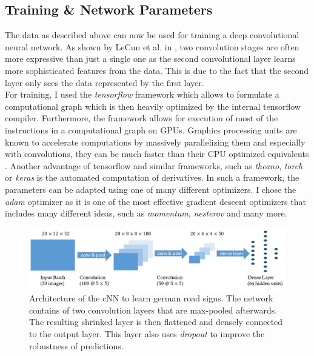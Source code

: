 \documentclass[11pt,a4paper]{article}
\begin{document}
\subsection{Training \& Network Parameters}
The data as described above can now be used for training a deep convolutional neural network. As shown by LeCun et al. in \cite{cnnOriginal}, two convolution stages are often more expressive than just a single one as the second convolutional layer learns more sophisticated features from the data. This is due to the fact that the second layer only sees the data represented by the first layer.\\
For training, I used the \textit{tensorflow} framework \cite{abadi2015tensorflow} which allows to formulate a computational graph which is then heavily optimized by the internal tensorflow compiler. Furthermore, the framework allows for execution of most of the instructions in a computational graph on GPUs. Graphics processing units are known to accelerate computations by massively parallelizing them and especially with convolutions, they can be much faster than their CPU optimized equivalents \cite{cudnn}. Another advantage of tensorflow and similar frameworks, such as \textit{theano}, \textit{torch} or \textit{keras} is the automated computation of derivatives. In such a framework, the parameters can be adapted using one of many different optimizers. I chose the \textit{adam} optimizer \cite{overviewGD} as it is one of the most effective gradient descent optimizers that includes many different ideas, such as \textit{momentum}, \textit{nesterov} and many more.
\begin{figure}[h!]
	\includegraphics[width=\textwidth]{cnn_architecture.png}
	\centering
	\caption[Architecture]{Architecture of the cNN to learn german road signs. The network contains of two convolution layers that are max-pooled afterwards. The resulting shrinked layer is then flattened and densely connected to the output layer. This layer also uses \textit{dropout} to improve the robustness of predictions.}
	\label{fig:architecture}
\end{figure}
\end{document}
